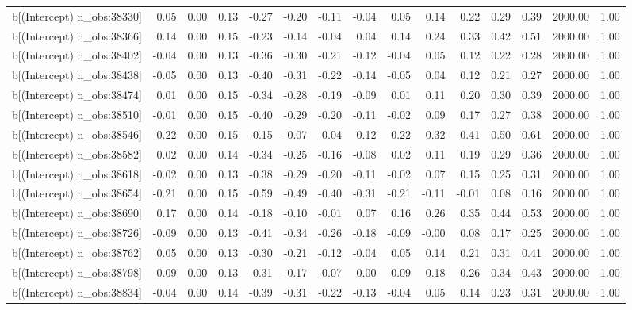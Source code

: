 \begin{table}[ht]
\begin{tabular}{rrrrrrrrrrrrrrr}
  b[(Intercept) n\_obs:38330] & 0.05 & 0.00 & 0.13 & -0.27 & -0.20 & -0.11 & -0.04 & 0.05 & 0.14 & 0.22 & 0.29 & 0.39 & 2000.00 & 1.00 \\ 
  b[(Intercept) n\_obs:38366] & 0.14 & 0.00 & 0.15 & -0.23 & -0.14 & -0.04 & 0.04 & 0.14 & 0.24 & 0.33 & 0.42 & 0.51 & 2000.00 & 1.00 \\ 
  b[(Intercept) n\_obs:38402] & -0.04 & 0.00 & 0.13 & -0.36 & -0.30 & -0.21 & -0.12 & -0.04 & 0.05 & 0.12 & 0.22 & 0.28 & 2000.00 & 1.00 \\ 
  b[(Intercept) n\_obs:38438] & -0.05 & 0.00 & 0.13 & -0.40 & -0.31 & -0.22 & -0.14 & -0.05 & 0.04 & 0.12 & 0.21 & 0.27 & 2000.00 & 1.00 \\ 
  b[(Intercept) n\_obs:38474] & 0.01 & 0.00 & 0.15 & -0.34 & -0.28 & -0.19 & -0.09 & 0.01 & 0.11 & 0.20 & 0.30 & 0.39 & 2000.00 & 1.00 \\ 
  b[(Intercept) n\_obs:38510] & -0.01 & 0.00 & 0.15 & -0.40 & -0.29 & -0.20 & -0.11 & -0.02 & 0.09 & 0.17 & 0.27 & 0.38 & 2000.00 & 1.00 \\ 
  b[(Intercept) n\_obs:38546] & 0.22 & 0.00 & 0.15 & -0.15 & -0.07 & 0.04 & 0.12 & 0.22 & 0.32 & 0.41 & 0.50 & 0.61 & 2000.00 & 1.00 \\ 
  b[(Intercept) n\_obs:38582] & 0.02 & 0.00 & 0.14 & -0.34 & -0.25 & -0.16 & -0.08 & 0.02 & 0.11 & 0.19 & 0.29 & 0.36 & 2000.00 & 1.00 \\ 
  b[(Intercept) n\_obs:38618] & -0.02 & 0.00 & 0.13 & -0.38 & -0.29 & -0.20 & -0.11 & -0.02 & 0.07 & 0.15 & 0.25 & 0.31 & 2000.00 & 1.00 \\ 
  b[(Intercept) n\_obs:38654] & -0.21 & 0.00 & 0.15 & -0.59 & -0.49 & -0.40 & -0.31 & -0.21 & -0.11 & -0.01 & 0.08 & 0.16 & 2000.00 & 1.00 \\ 
  b[(Intercept) n\_obs:38690] & 0.17 & 0.00 & 0.14 & -0.18 & -0.10 & -0.01 & 0.07 & 0.16 & 0.26 & 0.35 & 0.44 & 0.53 & 2000.00 & 1.00 \\ 
  b[(Intercept) n\_obs:38726] & -0.09 & 0.00 & 0.13 & -0.41 & -0.34 & -0.26 & -0.18 & -0.09 & -0.00 & 0.08 & 0.17 & 0.25 & 2000.00 & 1.00 \\ 
  b[(Intercept) n\_obs:38762] & 0.05 & 0.00 & 0.13 & -0.30 & -0.21 & -0.12 & -0.04 & 0.05 & 0.14 & 0.21 & 0.31 & 0.41 & 2000.00 & 1.00 \\ 
  b[(Intercept) n\_obs:38798] & 0.09 & 0.00 & 0.13 & -0.31 & -0.17 & -0.07 & 0.00 & 0.09 & 0.18 & 0.26 & 0.34 & 0.43 & 2000.00 & 1.00 \\ 
  b[(Intercept) n\_obs:38834] & -0.04 & 0.00 & 0.14 & -0.39 & -0.31 & -0.22 & -0.13 & -0.04 & 0.05 & 0.14 & 0.23 & 0.31 & 2000.00 & 1.00 \\ 

\end{tabular}
\end{table}
